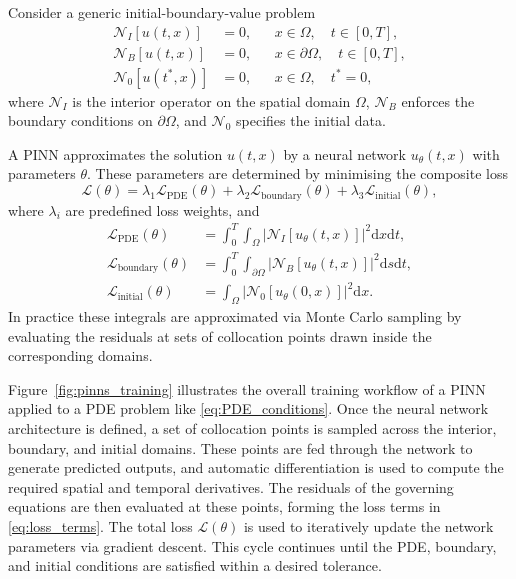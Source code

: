 \documentclass[12pt]{report} %
\theoremstyle{plain} %
\theoremstyle{definition} %
\theoremstyle{remark} %
\begin{document}
Consider a generic initial-boundary-value problem
\begin{equation}
	\begin{aligned}
	\mathcal{N}_I[u(t,x)] &= 0, && x\in\Omega,\quad t\in [0,T], \\
	\mathcal{N}_B[u(t,x)] &= 0, && x\in\partial\Omega,\quad t\in [0,T], \\
	\mathcal{N}_0[u(t^*,x)] &= 0, && x\in\Omega,\quad t^*=0,
	\end{aligned}
	\label{eq:PDE_conditions}
\end{equation}
where \(\mathcal N_I\) is the interior operator on the spatial domain
\(\Omega\), \(\mathcal N_B\) enforces the boundary conditions on
\(\partial\Omega\), and \(\mathcal N_0\) specifies the initial data.

A PINN approximates the solution \(u(t,x)\) by a neural network
\(u_\theta(t,x)\) with parameters \(\theta\). These parameters are determined
by minimising the composite loss
\begin{equation}
	\mathcal{L}(\theta) = \lambda_1 \mathcal{L}_{\text{PDE}}(\theta) + \lambda_2 \mathcal{L}_{\text{boundary}}(\theta) + \lambda_3 \mathcal{L}_{\text{initial}}(\theta),
	\label{eq:total_loss}
\end{equation}
where \(\lambda_i\) are predefined loss weights, and
\begin{equation}
	\begin{aligned}
		\mathcal{L}_{\text{PDE}}(\theta) &= \int_{0}^{T}\int_{\Omega}\left|\mathcal{N}_I[u_\theta(t,x)]\right|^2\mathrm{d}x\mathrm{d}t, \\
		\mathcal{L}_{\text{boundary}}(\theta) &= \int_{0}^{T}\int_{\partial\Omega}\left|\mathcal{N}_B[u_\theta(t,x)]\right|^2\mathrm{d}s\mathrm{d}t, \\
		\mathcal{L}_{\text{initial}}(\theta) &= \int_{\Omega}\left|\mathcal{N}_0[u_\theta(0,x)]\right|^2\mathrm{d}x.
	\end{aligned}
	\label{eq:loss_terms}
\end{equation}
In practice these integrals are approximated via Monte Carlo sampling by
evaluating the residuals at sets of collocation points drawn inside the
corresponding domains.

Figure~\ref{fig:pinns_training} illustrates the overall training workflow of a PINN applied to a 
PDE problem like \eqref{eq:PDE_conditions}. Once the neural network architecture is defined, a 
set of collocation points is sampled across the interior, boundary, and initial domains. These points 
are fed through the network to generate predicted outputs, and automatic differentiation is used to compute the 
required spatial and temporal derivatives. The residuals of the governing equations are then evaluated at these points, 
forming the loss terms in \eqref{eq:loss_terms}. The total loss \(\mathcal{L}(\theta)\) is used to iteratively update the 
network parameters via gradient descent. This cycle continues until the PDE, boundary, and initial conditions are satisfied 
within a desired tolerance.
\end{document}
